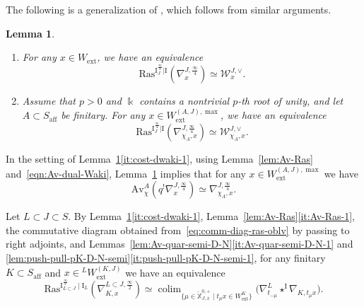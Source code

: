 \documentclass[11pt]{amsart}
\numberwithin{equation}{section}
\theoremstyle{plain}
\newtheorem{lem}[thm]{Lemma}
\theoremstyle{definition}
\newcommand{\I}{{\mathrm I}}
\renewcommand{\k}{\Bbbk}
\newcommand{\sW}{{\mathcal W}}
\newcommand{\X}{{\mathbb X}}
\newcommand{\Xd}{\check{\X}}
\newcommand{\semi}{{{\frac{\infty}{2}}}}
\newcommand{\quar}{{{\frac{\infty}{4}}}}
\newcommand{\Av}{\mathrm{Av}}
\newcommand{\ex}{\mathrm{ext}}
\newcommand{\af}{\mathrm{aff}}
\newcommand{\Ras}{\mathrm{Ras}}
\DeclareMathOperator*{\colim}{colim}
\begin{document}
The following is a generalization of \cite[Corollary 6.14]{adr}, which follows from similar arguments. 

\begin{lem}
\label{lem:cost-dwaki}
\begin{enumerate}
\item
\label{it:cost-dwaki-1}
For any $x\in W_\ex$,
we have an equivalence
\[
\Ras^{\I^\quar_J|\I}(\nabla_x^{J,\quar}) \simeq \sW^{J,\vee}_x. 
\]
\item
\label{it:cost-dwaki-2}
Assume that $p>0$ and $\k$ contains a nontrivial $p$-th root of unity, and let $A \subset S_\af$ be finitary.
For any $x\in W_\ex^{(A,J),\max}$,
we have an equivalence
\[
\Ras^{\I^\quar_J|\I}(\nabla_{\chi_A,x}^{J,\quar}) \simeq \sW^{J,\vee}_{\chi_A,x}. 
\]
\end{enumerate}
\end{lem}

In the setting of Lemma~\ref{lem:cost-dwaki}\eqref{it:cost-dwaki-1}, using Lemma~\ref{lem:Av-Ras} and~\eqref{eqn:Av-dual-Waki}, Lemma~\ref{lem:cost-dwaki} implies that for any $x\in W_\ex^{(A,J),\max}$ we have
\begin{equation}
\label{eqn:Avchi-nabla-quar}
\Av^A_\chi(q^! \nabla_x^{J,\quar}) \simeq \nabla_{\chi_A,x}^{J,\quar}.
\end{equation}

Let $L\subset J\subset S$. 
By Lemma~\ref{lem:cost-dwaki}\eqref{it:cost-dwaki-1}, Lemma~\ref{lem:Av-Ras}\eqref{it:Av-Ras-1}, the commutative diagram obtained from~\eqref{eq:comm-diag-ras-oblv} by passing to right adjoints, and Lemmas~\ref{lem:Av-quar-semi-D-N}\eqref{it:Av-quar-semi-D-N-1} and \ref{lem:push-pull-pK-D-N-semi}\eqref{it:push-pull-pK-D-N-semi-1}, for any finitary $K\subset S_\af$ and $x\in {}^LW^{(K,J)}_\ex$ we have an equivalence 
\begin{equation}
\label{equ:costd-K-colim}
\Ras^{\I^\semi_{L\subset J}\mid \I_L}(\nabla_{K,x}^{L\subset J,\semi}) 
\simeq 
\colim_{\{\mu\in \Xd_{J,x}^{0,+} \mid t_\mu x \in W_\ex^K\}} \big( 
\nabla^L_{t_{-\mu}} \star^{\I} \nabla_{K,t_\mu x} 
\big).
\end{equation}
\end{document}
